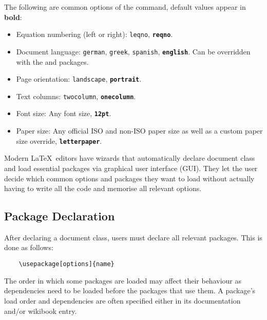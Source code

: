 The following are common options of the  command,
default values appear in \textbf{bold}:
\begin{itemize}
\item Equation numbering (left or right): \verb|leqno|,
  \textbf{\texttt{reqno}}.
\item Document language: \verb|german|, \verb|greek|, \verb|spanish|,
  \textbf{\texttt{english}}.  Can be overridden with the 
  and  packages.
\item Page orientation: \verb|landscape|, \textbf{\texttt{portrait}}.
\item Text columns: \verb|twocolumn|, \textbf{\texttt{onecolumn}}.
\item Font size: Any font size, \textbf{\texttt{12pt}}.
\item Paper size: Any official ISO and non-ISO paper size as well as a
  custom paper size override, \textbf{\texttt{letterpaper}}.
\end{itemize}

Modern \LaTeX~editors have wizards that automatically declare document
class and load essential packages via graphical user interface (GUI).
They let the user decide which common options and packages they want
to load without actually having to write all the code and memorise all
relevant options.
%
\subsection{Package Declaration}
%
After declaring a document class, users must declare all relevant
packages.  This is done as follows:
\begin{verbatim}
	\usepackage[options]{name}
\end{verbatim}
The order in which some packages are loaded may affect their behaviour
as dependencies need to be loaded before the packages that use them.
A package's load order and dependencies are often specified either in
its documentation and/or wikibook entry.

